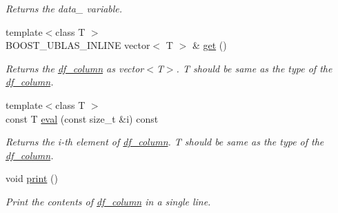 \begin{DoxyCompactItemize}
\begin{DoxyCompactList}\small\item\em Returns the data\+\_\+ variable. \end{DoxyCompactList}\item 
{\footnotesize template$<$class T $>$ }\\B\+O\+O\+S\+T\+\_\+\+U\+B\+L\+A\+S\+\_\+\+I\+N\+L\+I\+NE vector$<$ T $>$ \& \hyperlink{classboost_1_1numeric_1_1ublas_1_1df__column_a166ffc39d030e2773661bd24f79f66c3}{get} ()\hypertarget{classboost_1_1numeric_1_1ublas_1_1df__column_a166ffc39d030e2773661bd24f79f66c3}{}\label{classboost_1_1numeric_1_1ublas_1_1df__column_a166ffc39d030e2773661bd24f79f66c3}

\begin{DoxyCompactList}\small\item\em Returns the \hyperlink{classboost_1_1numeric_1_1ublas_1_1df__column}{df\+\_\+column} as vector$<$\+T$>$. T should be same as the type of the \hyperlink{classboost_1_1numeric_1_1ublas_1_1df__column}{df\+\_\+column}. \end{DoxyCompactList}\item 
{\footnotesize template$<$class T $>$ }\\const T \hyperlink{classboost_1_1numeric_1_1ublas_1_1df__column_ad0ef5ad76e5ac4b096c70a8c0bd29fbf}{eval} (const size\+\_\+t \&i) const \hypertarget{classboost_1_1numeric_1_1ublas_1_1df__column_ad0ef5ad76e5ac4b096c70a8c0bd29fbf}{}\label{classboost_1_1numeric_1_1ublas_1_1df__column_ad0ef5ad76e5ac4b096c70a8c0bd29fbf}

\begin{DoxyCompactList}\small\item\em Returns the i-\/th element of \hyperlink{classboost_1_1numeric_1_1ublas_1_1df__column}{df\+\_\+column}. T should be same as the type of the \hyperlink{classboost_1_1numeric_1_1ublas_1_1df__column}{df\+\_\+column}. \end{DoxyCompactList}\item 
void \hyperlink{classboost_1_1numeric_1_1ublas_1_1df__column_abacd7ce00ef0a7e3d89e099fefa2ba64}{print} ()\hypertarget{classboost_1_1numeric_1_1ublas_1_1df__column_abacd7ce00ef0a7e3d89e099fefa2ba64}{}\label{classboost_1_1numeric_1_1ublas_1_1df__column_abacd7ce00ef0a7e3d89e099fefa2ba64}

\begin{DoxyCompactList}\small\item\em Print the contents of \hyperlink{classboost_1_1numeric_1_1ublas_1_1df__column}{df\+\_\+column} in a single line. \end{DoxyCompactList}\end{DoxyCompactItemize}
